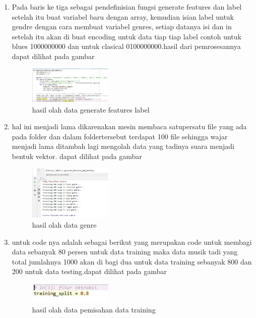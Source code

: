 \begin{enumerate}
        \item  Pada baris ke tiga sebagai pendefinisian fungsi generate features dan label setelah itu buat variabel baru dengan array, kemudian isian label untuk gendre dengan cara membuat variabel genres, setiap datanya isi  dan in setelah itu akan di buat encoding untuk data tiap tiap label contoh untuk blues 1000000000 dan untuk clasical 0100000000.hasil dari pemrosesannya dapat dilihat pada gambar
        \begin{figure}[H]
            \includegraphics[width=4cm]{figures/1174039/chapter6/4.jpg}
            \centering
            \caption{hasil olah data generate features label}
        \end{figure}

        
        \item  hal ini menjadi lama dikarenakan mesin membaca satupersatu file yang ada pada folder dan dalam foldertersebut terdapat 100 file sehingga wajar menjadi lama ditambah lagi mengolah data yang tadinya suara menjadi bentuk vektor.  dapat dilihat pada gambar
        \begin{figure}[H]
            \includegraphics[width=4cm]{figures/1174039/chapter6/5.jpg}
            \centering
            \caption{hasil olah data genre}
        \end{figure}
        
        \item untuk code nya adalah sebagai berikut  yang merupakan code untuk membagi data sebanyak 80 persen untuk data training maka data musik tadi yang total jumlahnya 1000 akan di bagi dua untuk data training sebanyak 800  dan 200 untuk data testing.dapat dilihat pada gambar
        \begin{figure}[H]
            \includegraphics[width=4cm]{figures/1174039/chapter6/6.jpg}
            \centering
            \caption{hasil olah data pemisahan data training}
        \end{figure}
        

\end{enumerate}

